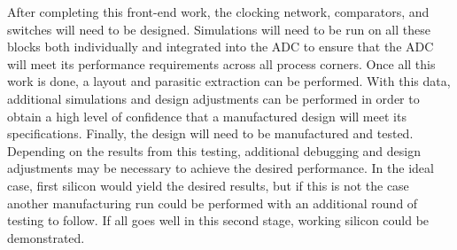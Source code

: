 After completing this front-end work, the clocking network, comparators, and switches will need to be designed. Simulations will need to be run on all these blocks both individually and integrated into the ADC to ensure that the ADC will meet its performance requirements across all process corners. Once all this work is done, a layout and parasitic extraction can be performed. With this data, additional simulations and design adjustments can be performed in order to obtain a high level of confidence that a manufactured design will meet its specifications. Finally, the design will need to be manufactured and tested. Depending on the results from this testing, additional debugging and design adjustments may be necessary to achieve the desired performance. In the ideal case, first silicon would yield the desired results, but if this is not the case another manufacturing run could be performed with an additional round of testing to follow. If all goes well in this second stage, working silicon could be demonstrated.